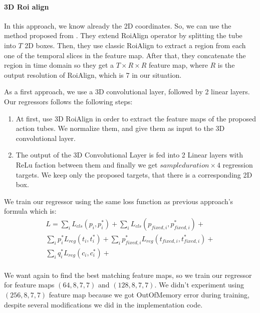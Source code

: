 \paragraph{3D Roi align}
In this approach, we know already the 2D coordinates. So, we can use the method proposed from \cite{DBLP:journals/corr/abs-1712-09184}. They
extend RoiAlign operator by splitting the tube into $T$ 2D boxes. Then, they use classic RoiAlign to extract a region from each one 
of the temporal slices in the feature map. After that, they concatenate the region in time domain so they get a $T \times R \times R$
feature map, where $R$ is the output resolution of RoiAlign, which is 7 in our situation. \par

As a first approach, we use a 3D convolutional layer, followed by 2 linear layers. Our regressors follows the following steps:
\begin{enumerate}
\item At first, use 3D RoiAlign in order to extract the feature maps of the proposed action tubes. We normalize them, and give them as input to the 3D
  convolutional layer.
\item The output of the 3D Convolutional Layer is fed into 2 Linear layers with ReLu faction between them and finally we get $sample duration \times 4$
  regression targets. We keep only the proposed targets, that there is a corresponding 2D box.
\end{enumerate}


We train our regressor using the same loss function as previous approach's formula which is:
\begin{equation*} 
\begin{split}
 L  =  \sum_iL_{cls}(p_i, p_i^*) + \sum_iL_{cls}(p_{fixed,i}, p_{fixed,i}^*) + \\
 \sum_ip_i^*L_{reg}(t_i,t_i^*) + \sum_ip_{fixed,i}^*L_{reg}(t_{fixed,i},t_{fixed,i}^*) + \\
  \sum_iq_i^*L_{reg}(c_{i}, c_{i}^*) + \\
\end{split}
\end{equation*}

We want again to find the best matching feature maps, so we train our regressor for feature maps
$(64,8,7,7)$ and $(128,8,7,7)$. We didn't experiment using $(256,8,7,7)$ feature map because
we got OutOfMemory error during training, despite several modifications we did in the
implementation code.

